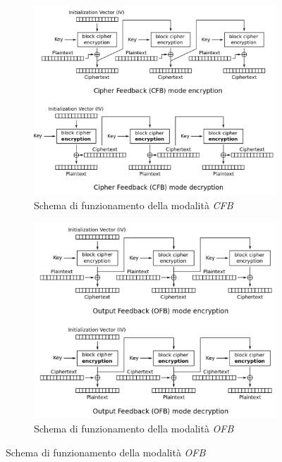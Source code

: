 \begin{figure}[h]
\begin{subfigure}{0.48\textwidth}
        \label{fig:aes-cbc}
    \end{subfigure}
    \begin{subfigure}{0.48\textwidth}
        \includegraphics[width=1\textwidth]{capitoli/figure-crittografia/aes-cfb.png}
        \caption{Schema di funzionamento della modalità \emph{CFB}}
        \label{fig:aes-cfb}
    \end{subfigure}
    \begin{subfigure}{0.48\textwidth}
        \includegraphics[width=1\textwidth]{capitoli/figure-crittografia/aes-ofb.png}
        \caption{Schema di funzionamento della modalità \emph{OFB}}

\end{subfigure}
\end{figure}
